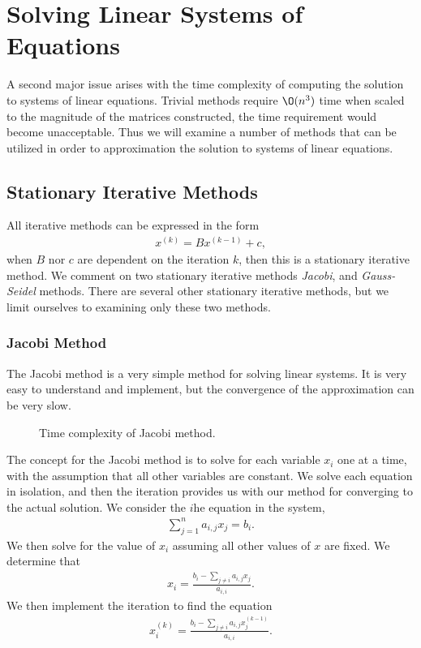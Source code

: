 \documentclass[../fem.tex]{subfile}
\begin{document}
\section{Solving Linear Systems of Equations}%
\label{sec:solving_linear_systems_of_equations}

A second major issue arises with the time complexity of computing the solution
to systems of linear equations. Trivial methods require $\O(n^3)$ time when
scaled to the magnitude of the matrices constructed, the time requirement
would become unacceptable. Thus we will examine a number of methods that can be
utilized in order to approximation the solution to systems of linear equations.

\subsection{Stationary Iterative Methods}%
\label{sub:stationary_iterative_methods}

All iterative methods can be expressed in the form
\begin{align*}
  x^{(k)}=Bx^{(k-1)}+c,
\end{align*}
when $B$ nor $c$ are dependent on the iteration $k$, then this is a stationary
iterative method. We comment on two stationary iterative methods
\textit{Jacobi}, and \textit{Gauss-Seidel} methods. There are several other
stationary iterative methods, but we limit ourselves to examining only these two
methods.

\subsubsection{Jacobi Method}%
\label{ssub:jacobi_method}

The Jacobi method is a very simple method for solving linear systems. It is
very easy to understand and implement, but the convergence of the approximation
can be very slow.

\begin{figure}[htpb]
  \centering
  
  \caption{Time complexity of Jacobi method.}
  \label{fig:j_time}
\end{figure}

The concept for the Jacobi method is to solve for each variable $x_i$ one at a
time, with the assumption that all other variables are constant. We solve each
equation in isolation, and then the iteration provides us with our method for
converging to the actual solution. We consider the $i$he equation in the
system,
\begin{align*}
  \sum_{j=1}^na_{i,j}x_j=b_i.
\end{align*}
We then solve for the value of $x_i$ assuming all other values of $x$ are
fixed. We determine that
\begin{align*}
  x_i=\frac{b_i-\sum_{j\neq i}a_{i,j}x_j}{a_{i,i}}.
\end{align*}
We then implement the iteration to find the equation
\begin{align*}
  x_i^{(k)}=\frac{b_i-\sum_{j\neq i}a_{i,j}x_j^{(k-1)}}{a_{i,i}}.
\end{align*}
\end{document}
